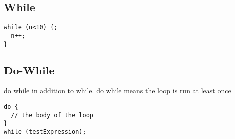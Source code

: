 
\subsection{While}


\begin{verbatim}
while (n<10) {;
  n++;
}
\end{verbatim}
\subsection{Do-While}
do while in addition to while. do while means the loop is run at least once

\begin{verbatim}
do {
  // the body of the loop
}
while (testExpression);
\end{verbatim}

